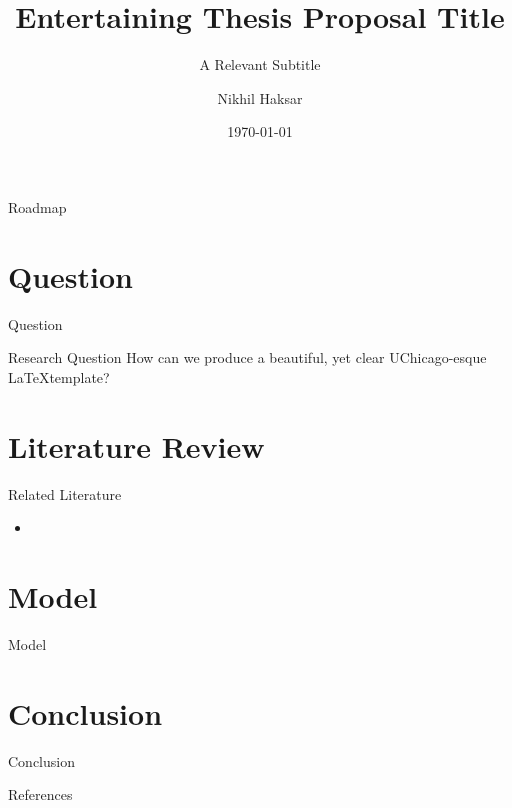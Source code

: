 \documentclass[notes,aspectratio=169]{beamer}       %
\title{Entertaining Thesis Proposal Title}
\subtitle{A Relevant Subtitle}
\author{Nikhil Haksar}
\institute[UChicago]{The University of Chicago}
\date{\today}
\begin{document}
\begin{frame}
\titlepage
\end{frame}
\begin{frame}{Roadmap}
    \tableofcontents
\end{frame}
\section{Question}
\begin{frame}{Question}
    \begin{block}{Research Question}
    How can we produce a beautiful, yet clear UChicago-esque \LaTeX template?
    \end{block}
\end{frame}

\section{Literature Review}
\begin{frame}{Related Literature}
    \begin{itemize}
        \item 
    \end{itemize}
\end{frame}

\section{Model}
\begin{frame}{Model}
\end{frame}

\section{Conclusion}
\begin{frame}{Conclusion}
    
\end{frame}

\begin{frame}{References}
\tiny
    
\end{frame}
\end{document}
